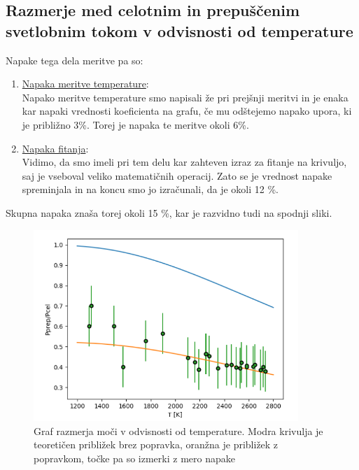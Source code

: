 \documentclass[11pt, a4paper]{article}
\theoremstyle{definition}
\theoremstyle{example}
\theoremstyle{izrek}
\begin{document}
\subsection{Razmerje med celotnim in prepuščenim svetlobnim tokom v odvisnosti od temperature}
Napake tega dela meritve pa so: 
\begin{enumerate}
\item \underline{Napaka meritve temperature}: \\
Napako meritve temperature smo napisali že pri prejšnji meritvi in je enaka kar napaki vrednosti koeficienta na grafu, če mu odštejemo napako upora, ki je približno 3\%.
Torej je napaka te meritve okoli 6\%.
\item \underline{Napaka fitanja}: \\
Vidimo, da smo imeli pri tem delu kar zahteven izraz za fitanje na krivuljo, saj je vseboval veliko matematičnih operacij. Zato se je vrednost napake spreminjala in na koncu smo jo izračunali, da je okoli 12 \%.
\end{enumerate}
Skupna napaka znaša torej okoli 15 \%, kar je razvidno tudi na spodnji sliki. \\
\bigskip

\begin{figure}[H]
	\centering
    \includegraphics[width=10cm]{Graf,Silicij.png}
    \caption{Graf razmerja moči v odvisnosti od temperature. Modra krivulja je
teoretičen približek brez popravka, oranžna je približek z popravkom, točke
pa so izmerki z mero napake}
\end{figure}
\end{document}
